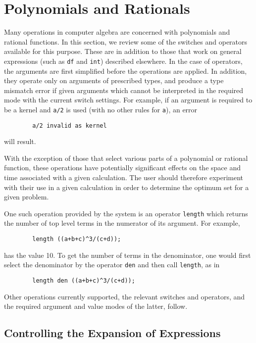 \chapter{Polynomials and Rationals}
\label{sec:core-polyrat}

Many operations in computer algebra are concerned with polynomials
 and rational functions.  In
this section, we review some of the switches and operators available for
this purpose.  These are in addition to those that work on general
expressions (such as \texttt{df} and \texttt{int}) described elsewhere.  In the
case of operators, the arguments are first simplified before the
operations are applied.  In addition, they operate only on arguments of
prescribed types, and produce a type mismatch error if given arguments
which cannot be interpreted in the required mode with the current switch
settings.  For example, if an argument is required to be a kernel and
\texttt{a/2} is used (with no other rules for \texttt{a}), an error
\begin{verbatim}
        a/2 invalid as kernel
\end{verbatim}
will result.

With the exception of those that select various parts of a polynomial or
rational function, these operations have potentially significant effects on
the space and time associated with a given calculation. The user should
therefore experiment with their use in a given calculation in order to
determine the optimum set for a given problem.

One such operation provided by the system is an operator \texttt{length}
 which returns the number of top level terms in the
numerator of its argument.  For example,
\begin{verbatim}
        length ((a+b+c)^3/(c+d));
\end{verbatim}
has the value 10.  To get the number of terms in the denominator, one
would first select the denominator by the operator \texttt{den}
and then call \texttt{length}, as in
\begin{verbatim}
        length den ((a+b+c)^3/(c+d));
\end{verbatim}
Other operations currently supported, the relevant switches and operators,
and the required argument and value modes of the latter, follow.

\section{Controlling the Expansion of Expressions}
\hypertarget{switch:EXP}{}


